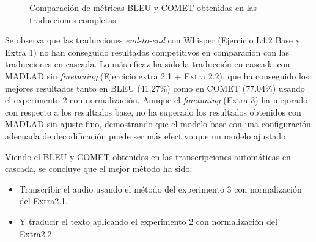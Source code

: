 \documentclass[11pt,spanish,listoffigures,listoftables]{tfgetsinf}
\begin{document}
\begin{figure}[H]
  \footnotesize
\centering
{}
\caption{Comparación de métricas BLEU y COMET obtenidas en las traducciones completas.}
\label{fig:resultados_finales}
\end{figure}

Se observa que las traducciones \textit{end-to-end} con Whisper (Ejercicio L4.2 Base y Extra 1) no han conseguido resultados competitivos en comparación con las traducciones en cascada. Lo más eficaz ha sido la traducción en cascada con MADLAD sin \textit{finetuning} (Ejercicio extra 2.1 + Extra 2.2), que ha conseguido los mejores resultados tanto en BLEU (41.27\%) como en COMET (77.04\%) usando el experimento 2 con normalización. Aunque el \textit{finetuning} (Extra 3) ha mejorado con respecto a los resultados base, no ha superado los resultados obtenidos con MADLAD sin ajuste fino, demostrando que el modelo base con una configuración adecuada de decodificación puede ser más efectivo que un modelo ajustado.

Viendo el BLEU y COMET obtenidos en las transcripciones automáticas en cascada, se concluye que el mejor método ha sido:
\begin{itemize}
  \item Transcribir el audio usando el método del experimento 3 con normalización del Extra2.1.
  \item Y traducir el texto aplicando el experimento 2 con normalización del Extra2.2.
\end{itemize}
\end{document}
